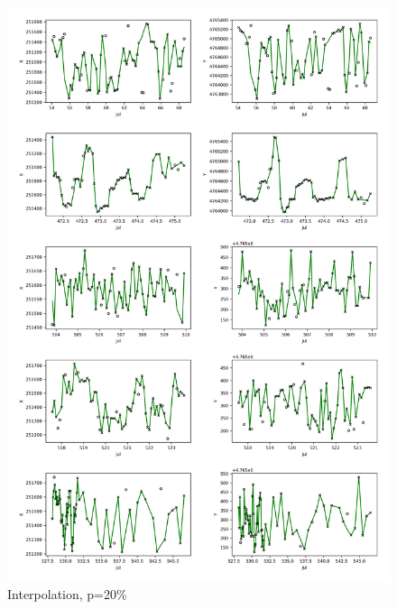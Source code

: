 \documentclass[11pt]{article}
\begin{document}
\begin{figure}[h]
  \centering
  \includegraphics[width=\textwidth]{../figure/20_5094_interpolation} %
  \caption{Interpolation, p=20\%}
  \label{fig: interpolation_20} %
\end{figure}
\end{document}
